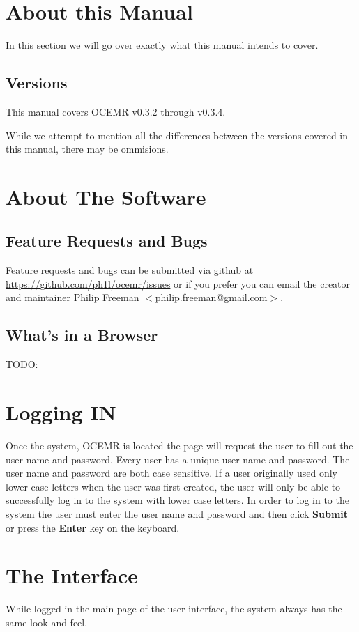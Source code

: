 \section{About this Manual}

In this section we will go over exactly what this manual intends to cover.

\subsection{Versions}
This manual covers OCEMR v0.3.2 through v0.3.4.

While we attempt to mention all the differences between the versions
covered in this manual, there may be ommisions.

\section{About The Software}



\subsection{Feature Requests and Bugs}
Feature requests and bugs can be submitted via github at
\url{https://github.com/ph1l/ocemr/issues} or if you prefer you
can email the creator and maintainer
Philip Freeman $<$\href{mailto:philip.freeman@gmail.com}{philip.freeman@gmail.com}$>$.

\subsection{What's in a Browser}
TODO:

\section{Logging IN}
Once the system, OCEMR is located the
page will request the user to fill out the user name and password.
Every user has a unique user name and password. The user name and
password are both case sensitive. If a user originally used only lower
case letters when the user was first created, the user will only be
able to successfully log in to the system with lower case letters. In
order to log in to the system the user must enter the user name and
password and then click \textbf{Submit }or press the \textbf{Enter} key
on the keyboard.

\section{The Interface}
While logged in the main page of the user interface, the system
always has the same look and feel. 

